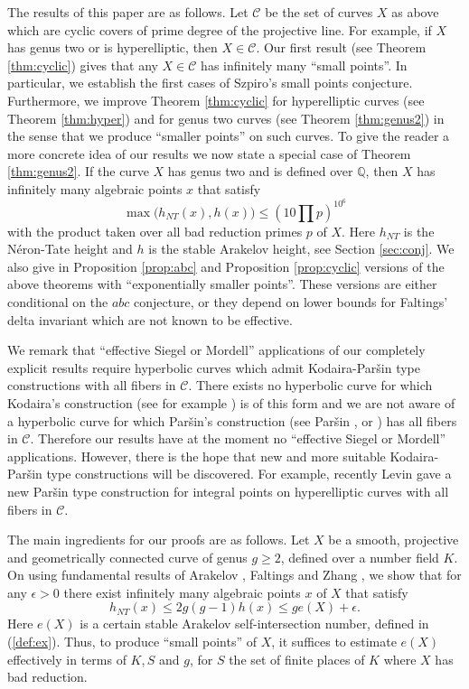 \documentclass[11pt]{article}
\numberwithin{equation}{section}
\newcommand {\QQ}  {{\mathbb Q}}
\newcommand {\p} {x}
\begin{document}
The results of this paper are as follows. Let $\mathcal C$ be the set of curves $X$ as above which are cyclic covers of prime degree of the projective line. 
For example, if $X$ has genus two or is hyperelliptic, then $X\in\mathcal C$.
Our first result (see Theorem \ref{thm:cyclic}) gives that any $X\in\mathcal C$ has infinitely many ``small points''.  
In particular, we establish the first cases of  Szpiro's small points conjecture.
Furthermore, we improve Theorem \ref{thm:cyclic} for hyperelliptic curves (see Theorem \ref{thm:hyper}) and for genus two curves (see Theorem \ref{thm:genus2}) in the sense that we produce ``smaller points'' on such curves. 
To give the reader a more concrete idea of our results we now state a special case of Theorem \ref{thm:genus2}. If the curve $X$ has genus two and is defined over $\QQ$, then $X$ has infinitely many algebraic points $\p$ that satisfy
$$\max\bigl(h_{NT}(\p),h(\p)\bigl)\leq (10\prod p)^{10^6}$$
with the product taken over all bad reduction primes $p$ of $X$. Here $h_{NT}$ is the N\'eron-Tate height and $h$ is the stable Arakelov height, see Section \ref{sec:conj}. 
We also give in Proposition \ref{prop:abc} and Proposition \ref{prop:cyclic} versions of the above theorems with ``exponentially smaller points''. 
These versions are either conditional on the $abc$ conjecture, or they depend on lower bounds for Faltings' delta invariant  which are not known to be effective.

We remark that ``effective Siegel or Mordell'' applications of our completely explicit results require hyperbolic curves which admit Kodaira-Par{\v{s}}in type constructions with all fibers in $\mathcal C$. There exists no hyperbolic curve for which  Kodaira's construction (see for example \cite[p.266]{szpiro:spa})  is of this form and we are not aware of a hyperbolic curve for which Par{\v{s}}in's construction (see Par{\v{s}}in \cite{parshin:construction}, or \cite[p.268]{szpiro:spa}) has all fibers in $\mathcal C$. Therefore our results have at the moment no ``effective Siegel or Mordell'' applications. However, there is the hope that new and more suitable Kodaira-Par{\v{s}}in type constructions will be discovered. For example, recently Levin \cite{levin:siegelshaf} gave a new Par{\v{s}}in type construction for integral points on hyperelliptic curves with all fibers in $\mathcal  C$. 
 
The main ingredients for our proofs are as follows. Let $X$ be a smooth, projective and geometrically connected curve of genus $g\geq 2$, defined over a number field $K$. On using fundamental results of Arakelov \cite{arakelov:intersectiontheory}, Faltings \cite{faltings:arithmeticsurfaces} and Zhang \cite{zhang:positive}, we show that for any $\epsilon>0$ there exist infinitely many algebraic points $\p$ of $X$ that satisfy 
\begin{equation}\label{eq:sp}
h_{NT}(\p)\leq  2g(g-1)h(\p)\leq  ge(X)+\epsilon.
\end{equation}
Here $e(X)$ is a certain stable Arakelov self-intersection number, defined in (\ref{def:ex}). Thus, to produce ``small points'' of $X$, it suffices to estimate $e(X)$ effectively in terms of $K,S$ and $g$, for $S$ the set of finite places of $K$ where $X$ has bad reduction.
\end{document}
